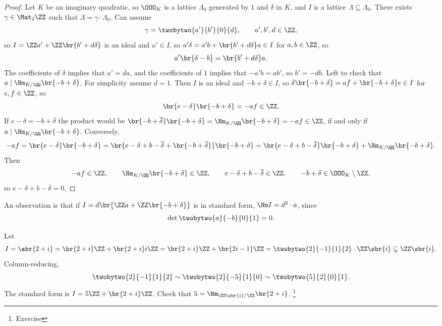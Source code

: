 \begin{proof}
Let $ K $ be an imaginary quadratic, so $ \OOO_K $ is a lattice $ \Lambda_0 $ generated by $ 1 $ and $ \delta $ in $ K $, and $ I $ is a lattice $ \Lambda \subseteq \Lambda_0 $. There exists $ \gamma \in \Mat_2 \ZZ $ such that $ \Lambda = \gamma \cdot \Lambda_0 $. Can assume
$$ \gamma = \twobytwo{a'}{b'}{0}{d}, \qquad a', b', d \in \ZZ, $$
so $ I = \ZZ a' + \ZZ\br{b' + d\delta} $ is an ideal and $ a' \in I $, so $ a'\delta = a'b + \br{b' + d\delta}a \in I $ for $ a, b \in \ZZ $, so
$$ a'\br{\delta - b} = \br{b' + d\delta}a. $$
The coefficients of $ \delta $ implies that $ a' = da $, and the coefficients of $ 1 $ implies that $ -a'b = ab' $, so $ b' = -db $. Left to check that $ a \mid \Nm_{K / \QQ} \br{-b + \delta} $. For simplicity assume $ d = 1 $. Then $ I $ is an ideal and $ -b + \delta \in I $, so $ \delta\br{-b + \delta} = af + \br{-b + \delta}e \in I $ for $ e, f \in \ZZ $, so
$$ \br{e - \delta}\br{-b + \delta} = -af \in \ZZ. $$
If $ e - \delta = -b + \overline{\delta} $ the product would be $ \br{-b + \overline{\delta}}\br{-b + \delta} = \Nm_{K / \QQ} \br{-b + \delta} = -af \in \ZZ $, if and only if $ a \mid \Nm_{K / \QQ} \br{-b + \delta} $. Conversely,
$$ -af = \br{e - \delta}\br{-b + \delta} = \br{e - \delta + b - \overline{\delta} + \br{-b + \overline{\delta}}}\br{-b + \delta} = \br{e - \delta + b - \overline{\delta}}\br{-b + \delta} + \Nm_{K / \QQ} \br{-b + \delta}. $$
Then
$$ -af \in \ZZ, \qquad \Nm_{K / \QQ} \br{-b + \delta} \in \ZZ, \qquad e - \delta + b - \overline{\delta} \in \ZZ, \qquad -b + \delta \in \OOO_K \setminus \ZZ, $$
so $ e - \delta + b - \overline{\delta} = 0 $.
\end{proof}

An observation is that if $ I = d\br{\ZZ a + \ZZ\br{-b + \delta}} $ is in standard form, $ \Nm I = d^2 \cdot a $, since
$$ \det \twobytwo{a}{-b}{0}{1} = 0. $$


\begin{example*}
Let
$$ I = \abr{2 + i} = \br{2 + i}\ZZ + \br{2 + i}i\ZZ = \br{2 + i}\ZZ + \br{2i - 1}\ZZ = \twobytwo{2}{-1}{1}{2} \cdot \ZZ\sbr{i} \subsetneq \ZZ\sbr{i}. $$
Column-reducing,
$$ \twobytwo{2}{-1}{1}{2} \sim \twobytwo{2}{-5}{1}{0} \sim \twobytwo{5}{2}{0}{1}. $$
The standard form is $ I = 5\ZZ + \br{2 + i}\ZZ $. Check that $ 5 = \Nm_{\ZZ\sbr{i} / \ZZ} \br{2 + i} $. \footnote{Exercise}
\end{example*}

\pagebreak

